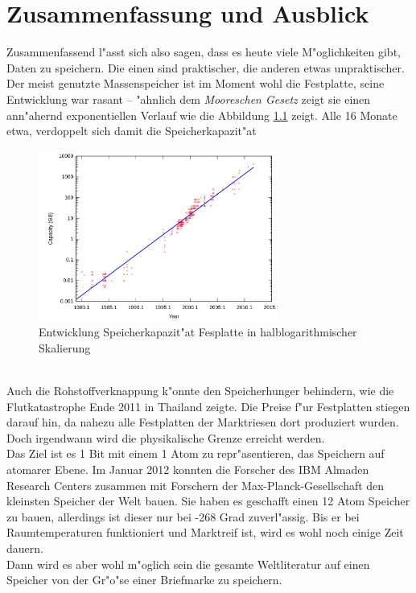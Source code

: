 
\chapter{Zusammenfassung und Ausblick}
\label{ch:Zusammenfassung}
Zusammenfassend l"asst sich also sagen, dass es heute viele M"oglichkeiten gibt, Daten zu speichern. Die einen sind praktischer, die anderen etwas unpraktischer.
Der meist genutzte Massenspeicher ist im Moment wohl die Festplatte, seine Entwicklung war rasant – "ahnlich dem \textit{Mooreschen Gesetz} zeigt sie einen ann"ahernd exponentiellen Verlauf wie die Abbildung \ref{fig:kapazit} zeigt. Alle 16 Monate etwa, verdoppelt sich damit die Speicherkapazit"at
\begin{figure}[ht]
				\centering
				\includegraphics[width=0.7\textwidth]{images/kapazit} 
				\caption[Entwicklung Speicherkapazit"at Fesplatte in halblogarithmischer Skalierung \cite{fig:kapazit}]{Entwicklung Speicherkapazit"at Fesplatte in halblogarithmischer Skalierung}
				\label{fig:kapazit}
				\end{figure}
\\
Auch die Rohstoffverknappung k"onnte den Speicherhunger behindern, wie die Flutkatastrophe Ende 2011 in Thailand zeigte. Die Preise f"ur Festplatten stiegen darauf hin, da nahezu alle Festplatten der Marktriesen dort produziert wurden.
\\
Doch irgendwann wird die physikalische Grenze erreicht werden.
\\
Das Ziel ist es 1 Bit mit einem 1 Atom zu repr"asentieren, das Speichern auf atomarer Ebene. Im Januar 2012 konnten die Forscher des IBM Almaden Research Centers zusammen mit Forschern der Max-Planck-Gesellschaft den kleinsten Speicher der Welt bauen. Sie haben es geschafft einen 12 Atom Speicher zu bauen, allerdings ist dieser nur bei -268 Grad zuverl"assig. Bis er bei Raumtemperaturen funktioniert und Marktreif ist, wird es wohl noch einige Zeit dauern.\cite{heise:ibm} 
\\
Dann wird es aber wohl m"oglich sein die gesamte Weltliteratur auf einen Speicher von der Gr"o"se einer Briefmarke zu speichern. 

